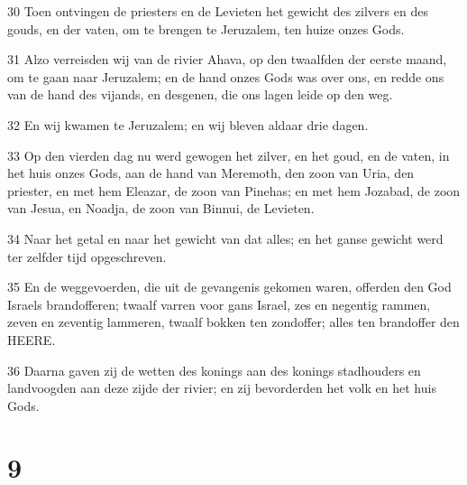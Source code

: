 \par 30 Toen ontvingen de priesters en de Levieten het gewicht des zilvers en des gouds, en der vaten, om te brengen te Jeruzalem, ten huize onzes Gods.
\par 31 Alzo verreisden wij van de rivier Ahava, op den twaalfden der eerste maand, om te gaan naar Jeruzalem; en de hand onzes Gods was over ons, en redde ons van de hand des vijands, en desgenen, die ons lagen leide op den weg.
\par 32 En wij kwamen te Jeruzalem; en wij bleven aldaar drie dagen.
\par 33 Op den vierden dag nu werd gewogen het zilver, en het goud, en de vaten, in het huis onzes Gods, aan de hand van Meremoth, den zoon van Uria, den priester, en met hem Eleazar, de zoon van Pinehas; en met hem Jozabad, de zoon van Jesua, en Noadja, de zoon van Binnui, de Levieten.
\par 34 Naar het getal en naar het gewicht van dat alles; en het ganse gewicht werd ter zelfder tijd opgeschreven.
\par 35 En de weggevoerden, die uit de gevangenis gekomen waren, offerden den God Israels brandofferen; twaalf varren voor gans Israel, zes en negentig rammen, zeven en zeventig lammeren, twaalf bokken ten zondoffer; alles ten brandoffer den HEERE.
\par 36 Daarna gaven zij de wetten des konings aan des konings stadhouders en landvoogden aan deze zijde der rivier; en zij bevorderden het volk en het huis Gods.

\chapter{9}

